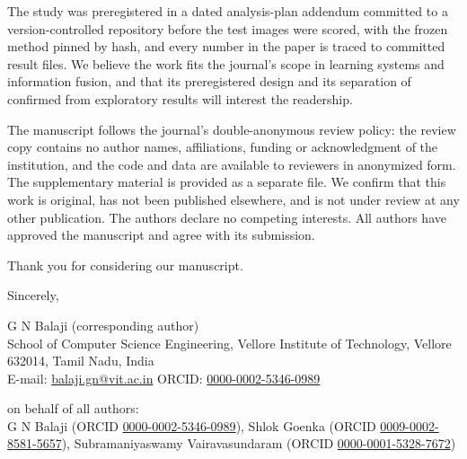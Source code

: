 \documentclass[11pt]{article}
\begin{document}
The study was preregistered in a dated analysis-plan addendum committed to a version-controlled repository before the test images were
scored, with the frozen method pinned by hash, and every number in the paper is traced to committed result files. We believe the work
fits the journal's scope in learning systems and information fusion, and that its preregistered design and its separation of confirmed
from exploratory results will interest the readership.

The manuscript follows the journal's double-anonymous review policy: the review copy contains no author names, affiliations,
funding or acknowledgment of the institution, and the code and data are available to reviewers in anonymized form. The
supplementary material is provided as a separate file. We confirm that this work is original, has not been published elsewhere,
and is not under review at any other publication. The authors declare no competing interests. All authors have approved the
manuscript and agree with its submission.

Thank you for considering our manuscript.

Sincerely,

G N Balaji (corresponding author)\\
School of Computer Science Engineering, Vellore Institute of Technology, Vellore 632014, Tamil Nadu, India\\
E-mail: \href{mailto:balaji.gn@vit.ac.in}{balaji.gn@vit.ac.in}\quad
ORCID: \href{https://orcid.org/0000-0002-5346-0989}{0000-0002-5346-0989}

on behalf of all authors:\\
G N Balaji (ORCID \href{https://orcid.org/0000-0002-5346-0989}{0000-0002-5346-0989}),
Shlok Goenka (ORCID \href{https://orcid.org/0009-0002-8581-5657}{0009-0002-8581-5657}),
Subramaniyaswamy Vairavasundaram (ORCID \href{https://orcid.org/0000-0001-5328-7672}{0000-0001-5328-7672})
\end{document}
